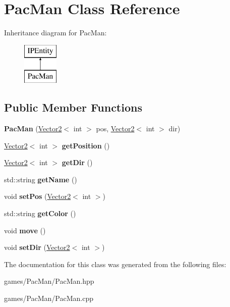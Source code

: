 \hypertarget{class_pac_man}{}\section{Pac\+Man Class Reference}
\label{class_pac_man}
Inheritance diagram for Pac\+Man\+:\begin{figure}[H]
\begin{center}
\leavevmode
\includegraphics[height=2.000000cm]{class_pac_man}
\end{center}
\end{figure}
\subsection*{Public Member Functions}
\begin{DoxyCompactItemize}
\item 
\mbox{\label{class_pac_man_a5ab6b0be0c7d80e35832d886d9c22789}} 
{\bfseries Pac\+Man} (\hyperlink{struct_vector2}{Vector2}$<$ int $>$ pos, \hyperlink{struct_vector2}{Vector2}$<$ int $>$ dir)
\item 
\mbox{\label{class_pac_man_a3c7a9c5a76023a8c710c18d1d2b5ff5f}} 
\hyperlink{struct_vector2}{Vector2}$<$ int $>$ {\bfseries get\+Position} ()
\item 
\mbox{\label{class_pac_man_a9300c86d9704b60f1efdaa015134877c}} 
\hyperlink{struct_vector2}{Vector2}$<$ int $>$ {\bfseries get\+Dir} ()
\item 
\mbox{\label{class_pac_man_a6271bcaed94b99d95e0188213704dada}} 
std\+::string {\bfseries get\+Name} ()
\item 
\mbox{\label{class_pac_man_aada56f8c4de59a0be1d1041bb561074f}} 
void {\bfseries set\+Pos} (\hyperlink{struct_vector2}{Vector2}$<$ int $>$)
\item 
\mbox{\label{class_pac_man_ae7395e5123f61e0f10106314baabd569}} 
std\+::string {\bfseries get\+Color} ()
\item 
\mbox{\label{class_pac_man_aeba4de62a1b7999054e290b5a84812b2}} 
void {\bfseries move} ()
\item 
\mbox{\label{class_pac_man_a2f6d02ec46957070b966c24b816d93dd}} 
void {\bfseries set\+Dir} (\hyperlink{struct_vector2}{Vector2}$<$ int $>$)
\end{DoxyCompactItemize}


The documentation for this class was generated from the following files\+:\begin{DoxyCompactItemize}
\item 
games/\+Pac\+Man/Pac\+Man.\+hpp\item 
games/\+Pac\+Man/Pac\+Man.\+cpp\end{DoxyCompactItemize}
